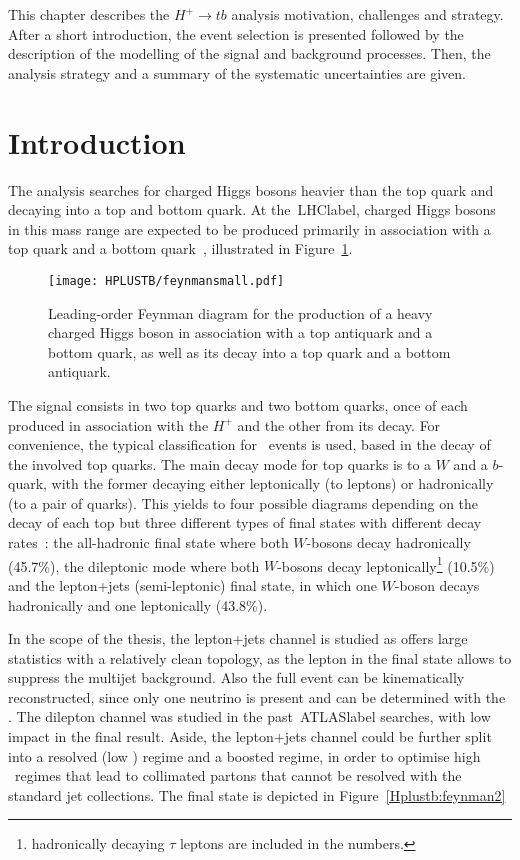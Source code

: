 This chapter describes the $H^+\to tb$ analysis motivation, challenges and strategy. After a short introduction, the event selection is presented followed by the description of the modelling of the signal and background processes. Then, the analysis strategy and a summary of the systematic uncertainties are given.



\section{Introduction}

The analysis searches for charged Higgs bosons heavier than the top quark and decaying into a top and bottom quark. At the~\acrshort{LHClabel}, charged Higgs bosons in this mass range are expected to be produced primarily in association with a top quark and a bottom quark~\cite{CYRM-2017-002}, illustrated in Figure~\ref{Hplustb:feynman1}.


\begin{figure}[htbp]
    \RawFloats
    \begin{center}
    \texttt{[image: HPLUSTB/feynmansmall.pdf]}
    \caption{
        Leading-order Feynman diagram for the production of a heavy charged Higgs boson in association with a top antiquark and a bottom quark, as well as its decay into a top quark and a bottom antiquark.
    }
    \label{Hplustb:feynman1}
    \end{center}
\end{figure}

The signal consists in two top quarks and two bottom quarks, once of each produced in association with the $H^+$ and the other from its decay. For convenience, the typical classification for \ttbar\ events is used, based in the decay of the involved top quarks. The main decay mode for top quarks is to a $W$ and a $b$-quark, with the former decaying either leptonically (to leptons) or hadronically (to a pair of quarks). This yields to four possible diagrams depending on the decay of each top but three different types of final states with different decay rates~\cite{pdg}: the all-hadronic final state where both $W$-bosons decay hadronically (45.7\%), the dileptonic mode where both $W$-bosons decay leptonically\footnote{hadronically decaying $\tau$ leptons are included in the numbers.} (10.5\%) and the lepton+jets (semi-leptonic) final state, in which one $W$-boson decays hadronically and one leptonically (43.8\%).

In the scope of the thesis, the lepton+jets channel is studied as offers large statistics with a relatively clean topology, as the lepton in the final state allows to suppress the multijet background. Also the full event can be kinematically reconstructed, since only one neutrino is present and can be determined with the \MET. The dilepton channel was studied in the past~\acrshort{ATLASlabel} searches, with low impact in the final result. Aside, the lepton+jets channel could be further split into a resolved (low \pT) regime and a boosted regime, in order to optimise high \pT\ regimes that lead to collimated partons that cannot be resolved with the standard jet collections. The final state is depicted in Figure~\ref{Hplustb:feynman2}


